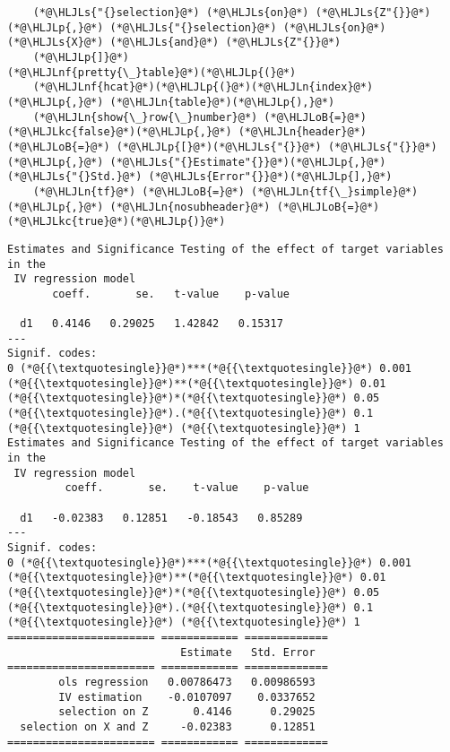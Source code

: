 \documentclass[12pt,a4paper]{article}
\newcommand{\HLJLkc}[1]{\textcolor[RGB]{59,151,46}{\textit{#1}}}
\newcommand{\HLJLn}[1]{#1}
\newcommand{\HLJLnf}[1]{\textcolor[RGB]{66,102,213}{#1}}
\newcommand{\HLJLs}[1]{\textcolor[RGB]{201,61,57}{#1}}
\newcommand{\HLJLoB}[1]{\textcolor[RGB]{102,102,102}{\textbf{#1}}}
\newcommand{\HLJLp}[1]{#1}
\begin{document}
\begin{lstlisting}
    (*@\HLJLs{"{}selection}@*) (*@\HLJLs{on}@*) (*@\HLJLs{Z"{}}@*)(*@\HLJLp{,}@*) (*@\HLJLs{"{}selection}@*) (*@\HLJLs{on}@*) (*@\HLJLs{X}@*) (*@\HLJLs{and}@*) (*@\HLJLs{Z"{}}@*)
    (*@\HLJLp{]}@*)
(*@\HLJLnf{pretty{\_}table}@*)(*@\HLJLp{(}@*)
    (*@\HLJLnf{hcat}@*)(*@\HLJLp{(}@*)(*@\HLJLn{index}@*)(*@\HLJLp{,}@*) (*@\HLJLn{table}@*)(*@\HLJLp{),}@*) 
    (*@\HLJLn{show{\_}row{\_}number}@*) (*@\HLJLoB{=}@*) (*@\HLJLkc{false}@*)(*@\HLJLp{,}@*) (*@\HLJLn{header}@*) (*@\HLJLoB{=}@*) (*@\HLJLp{[}@*)(*@\HLJLs{"{}}@*) (*@\HLJLs{"{}}@*)(*@\HLJLp{,}@*) (*@\HLJLs{"{}Estimate"{}}@*)(*@\HLJLp{,}@*) (*@\HLJLs{"{}Std.}@*) (*@\HLJLs{Error"{}}@*)(*@\HLJLp{],}@*)
    (*@\HLJLn{tf}@*) (*@\HLJLoB{=}@*) (*@\HLJLn{tf{\_}simple}@*)(*@\HLJLp{,}@*) (*@\HLJLn{nosubheader}@*) (*@\HLJLoB{=}@*) (*@\HLJLkc{true}@*)(*@\HLJLp{)}@*)
\end{lstlisting}

\begin{lstlisting}
Estimates and Significance Testing of the effect of target variables in the
 IV regression model
       coeff.       se.   t-value    p-value

  d1   0.4146   0.29025   1.42842   0.15317
---
Signif. codes:
0 (*@{{\textquotesingle}}@*)***(*@{{\textquotesingle}}@*) 0.001 (*@{{\textquotesingle}}@*)**(*@{{\textquotesingle}}@*) 0.01 (*@{{\textquotesingle}}@*)*(*@{{\textquotesingle}}@*) 0.05 (*@{{\textquotesingle}}@*).(*@{{\textquotesingle}}@*) 0.1 (*@{{\textquotesingle}}@*) (*@{{\textquotesingle}}@*) 1
Estimates and Significance Testing of the effect of target variables in the
 IV regression model
         coeff.       se.    t-value    p-value

  d1   -0.02383   0.12851   -0.18543   0.85289
---
Signif. codes:
0 (*@{{\textquotesingle}}@*)***(*@{{\textquotesingle}}@*) 0.001 (*@{{\textquotesingle}}@*)**(*@{{\textquotesingle}}@*) 0.01 (*@{{\textquotesingle}}@*)*(*@{{\textquotesingle}}@*) 0.05 (*@{{\textquotesingle}}@*).(*@{{\textquotesingle}}@*) 0.1 (*@{{\textquotesingle}}@*) (*@{{\textquotesingle}}@*) 1
======================= ============ =============
                           Estimate   Std. Error
======================= ============ =============
        ols regression   0.00786473   0.00986593
        IV estimation    -0.0107097    0.0337652
        selection on Z       0.4146      0.29025
  selection on X and Z     -0.02383      0.12851
======================= ============ =============
\end{lstlisting}
\end{document}
